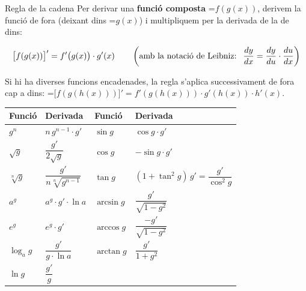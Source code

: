 \documentclass[11pt,a4paper]{article}
\newcommand{\fmm}[1]{\setbox0=\hbox{$#1$}\ifdim\wd0>\linewidth\fmdisp{#1}\else\mbox{\box0}\fi}
\newcommand{\fmdisp}[1]{\[\setbox2=\hbox{$\displaystyle #1$}\ifdim\wd2>\linewidth\resizebox{\linewidth}{!}{\box2}\else\box2\fi\]}
\begin{document}
\begin{fmdef}{Regla de la cadena}
Per derivar una \textbf{funció composta} \fmm{f(g(x))}, derivem la funció de fora (deixant dins \fmm{g(x)}) i multipliquem per la derivada de la de dins:

\fmdisp{\big[f(g(x))\big]'=f'\big(g(x)\big)\cdot g'(x)\qquad\left(\text{amb la notació de Leibniz: }\ \frac{dy}{dx}=\frac{dy}{du}\cdot\frac{du}{dx}\right)}

Si hi ha diverses funcions encadenades, la regla s'aplica successivament de fora cap a dins: \fmm{\big[f(g(h(x)))\big]'=f'(g(h(x)))\cdot g'(h(x))\cdot h'(x)}.

\begin{center}\renewcommand{\arraystretch}{1.5}\small\begin{tabularx}{\linewidth}{>{\raggedright\arraybackslash}p{3.2cm}>{\raggedright\arraybackslash}X>{\raggedright\arraybackslash}X>{\raggedright\arraybackslash}X}\toprule
\textbf{Funció} & \textbf{Derivada} & \textbf{Funció} & \textbf{Derivada}\\\midrule
$g^n$ & $n\,g^{n-1}\cdot g'$ & $\sin g$ & $\cos g\cdot g'$\\[3pt]
$\sqrt{g}$ & $\dfrac{g'}{2\sqrt{g}}$ & $\cos g$ & $-\sin g\cdot g'$\\[3pt]
$\sqrt[n]{g}$ & $\dfrac{g'}{n\sqrt[n]{g^{n-1}}}$ & $\tan g$ & $(1+\tan^2g)\,g'=\dfrac{g'}{\cos^2g}$\\[3pt]
$a^{g}$ & $a^{g}\cdot g'\cdot\ln a$ & $\arcsin g$ & $\dfrac{g'}{\sqrt{1-g^2}}$\\[3pt]
$e^{g}$ & $e^{g}\cdot g'$ & $\arccos g$ & $\dfrac{-g'}{\sqrt{1-g^2}}$\\[3pt]
$\log_a g$ & $\dfrac{g'}{g\cdot\ln a}$ & $\arctan g$ & $\dfrac{g'}{1+g^2}$\\[3pt]
$\ln g$ & $\dfrac{g'}{g}$ &  & \\[3pt]
\bottomrule\end{tabularx}\end{center}
\end{fmdef}
\end{document}

